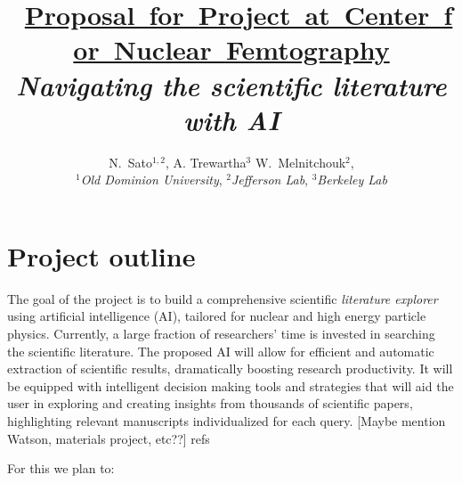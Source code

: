 \documentclass{article}[12pt,preprint]
\begin{document}
\title{\mbox{\large
	\underline{Proposal for Project at Center for Nuclear Femtography}}
\vspace{0.6cm}
\\ \emph{Navigating the scientific literature with AI}
\vspace{0.2cm}
}

\author{
  N.~Sato$^{1,2}$,
  A. Trewartha$^{3}$ 
	W.~Melnitchouk$^2$,
	\vspace{0.3cm}
\\
$^1${\it Old Dominion University},
$^2${\it Jefferson Lab},
$^3${\it Berkeley Lab }}

\vspace{-6ex}

\date{}

\maketitle

\noindent \color{black}

\section{Project outline}

The goal of the project is to build a comprehensive scientific
{\it literature explorer} using artificial intelligence (AI),
tailored for nuclear and high energy particle physics.
%
Currently, a large fraction of researchers' time is invested in 
searching the scientific literature.  The proposed AI will allow
for efficient and automatic extraction of scientific results,
dramatically boosting research productivity.
%
It will be equipped with intelligent decision making tools and 
strategies that will aid the user in exploring and creating insights 
from thousands of scientific papers, highlighting relevant manuscripts 
individualized for each query.
%
{\color{red}[Maybe mention Watson, materials project, etc??] refs }

%
For this we plan to:
\end{document}
